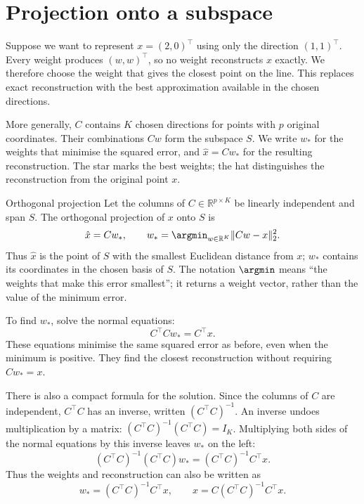 \documentclass[a4paper,12pt,oneside]{report}
\begin{document}
\clearpage
\section{Projection onto a subspace}

Suppose we want to represent $x=(2,0)^\top$ using only the direction
$(1,1)^\top$. Every weight produces $(w,w)^\top$, so no weight
reconstructs $x$ exactly. We therefore choose the weight that gives
the closest point on the line. This replaces exact reconstruction
with the best approximation available in the chosen directions.

More generally, $C$ contains $K$ chosen directions for points with
$p$ original coordinates. Their combinations $Cw$ form the subspace
$S$. We write $w_*$ for the weights that minimise the squared error,
and $\hat{x}=Cw_*$ for the resulting reconstruction. The star marks
the best weights; the hat distinguishes the reconstruction from
the original point $x$.

\begin{frameddefn}{Orthogonal projection}\label{def:orthogonal-projection}
Let the columns of $C\in\mathbb{R}^{p\times K}$ be linearly independent
and span $S$. The orthogonal projection of $x$ onto $S$ is
\[
  \hat{x}=Cw_*,\qquad
  w_*=\argmin_{w\in\mathbb{R}^K}\lVert Cw-x\rVert_2^2.
\]
Thus $\hat{x}$ is the point of $S$ with the smallest Euclidean distance
from $x$; $w_*$ contains its coordinates in the chosen basis of $S$.
The notation $\argmin$ means ``the weights that make this error
smallest''; it returns a weight vector, rather than the value of the
minimum error.
\end{frameddefn}

To find $w_*$, solve the normal equations:
\[
  C^\top Cw_*=C^\top x.
\]
These equations minimise the same squared error as before, even when
the minimum is positive. They find the closest reconstruction without
requiring $Cw_*=x$.

There is also a compact formula for the solution. Since the columns
of $C$ are independent, $C^\top C$ has an inverse, written
$(C^\top C)^{-1}$. An inverse undoes multiplication by a matrix:
$(C^\top C)^{-1}(C^\top C)=I_K$. Multiplying both sides of the normal
equations by this inverse leaves $w_*$ on the left:
\[
  (C^\top C)^{-1}(C^\top C)w_*
   =(C^\top C)^{-1}C^\top x.
\]
Thus the weights and reconstruction can also be written as
\[
  w_*=(C^\top C)^{-1}C^\top x,\qquad
  \hat{x}=C(C^\top C)^{-1}C^\top x.
\]
\end{document}
